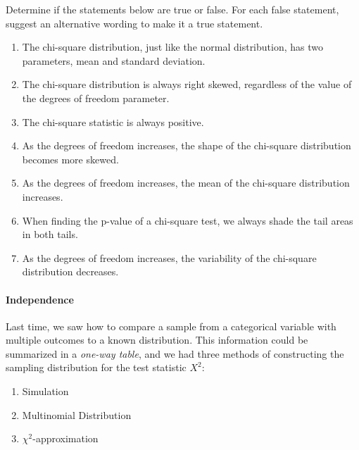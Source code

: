 \documentclass[10pt]{article}\usepackage[]{graphicx}\usepackage[]{color}
\begin{document}
Determine if the statements below are true or false. For each false statement, suggest an alternative wording to make it a true statement.
\begin{enumerate}
  \itemsep0.2in
  \item The chi-square distribution, just like the normal distribution, has two parameters, mean and standard deviation.
  \item The chi-square distribution is always right skewed, regardless of the value of the degrees of freedom parameter.
  \item The chi-square statistic is always positive.
  \item As the degrees of freedom increases, the shape of the chi-square distribution becomes more skewed.
  \item As the degrees of freedom increases, the mean of the chi-square distribution increases.
  \item When finding the p-value of a chi-square test, we always shade the tail areas in both tails.
  \item As the degrees of freedom increases, the variability of the chi-square distribution decreases.
\end{enumerate}

\paragraph{Independence}

Last time, we saw how to compare a sample from a categorical variable with multiple outcomes to a known distribution. This information could be summarized in a \emph{one-way table}, and we had three methods of constructing the sampling distribution for the test statistic $X^2$:
\begin{enumerate}
  \item Simulation
  \item Multinomial Distribution
  \item $\chi^2$-approximation
\end{enumerate}
\end{document}
